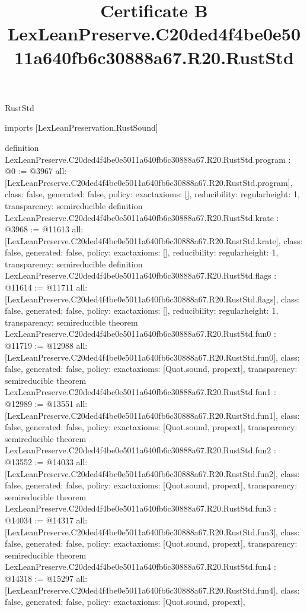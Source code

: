 \begin{lexlean}{RustStd}
\title{Certificate B LexLeanPreserve.C20ded4f4be0e5011a640fb6c30888a67.R20.RustStd}
\begin{coremodule}
imports [LexLeanPreservation.RustSound]

definition LexLeanPreserve.C20ded4f4be0e5011a640fb6c30888a67.R20.RustStd.program : @0 := @3967 {
  all: [LexLeanPreserve.C20ded4f4be0e5011a640fb6c30888a67.R20.RustStd.program],
  class: false,
  generated: false,
  policy: exact{axioms: []},
  reducibility: regular{height: 1},
  transparency: semireducible
}
definition LexLeanPreserve.C20ded4f4be0e5011a640fb6c30888a67.R20.RustStd.krate : @3968 := @11613 {
  all: [LexLeanPreserve.C20ded4f4be0e5011a640fb6c30888a67.R20.RustStd.krate],
  class: false,
  generated: false,
  policy: exact{axioms: []},
  reducibility: regular{height: 1},
  transparency: semireducible
}
definition LexLeanPreserve.C20ded4f4be0e5011a640fb6c30888a67.R20.RustStd.flags : @11614 := @11711 {
  all: [LexLeanPreserve.C20ded4f4be0e5011a640fb6c30888a67.R20.RustStd.flags],
  class: false,
  generated: false,
  policy: exact{axioms: []},
  reducibility: regular{height: 1},
  transparency: semireducible
}
theorem LexLeanPreserve.C20ded4f4be0e5011a640fb6c30888a67.R20.RustStd.fun0 : @11719 := @12988 {
  all: [LexLeanPreserve.C20ded4f4be0e5011a640fb6c30888a67.R20.RustStd.fun0],
  class: false,
  generated: false,
  policy: exact{axioms: [Quot.sound, propext]},
  transparency: semireducible
}
theorem LexLeanPreserve.C20ded4f4be0e5011a640fb6c30888a67.R20.RustStd.fun1 : @12989 := @13551 {
  all: [LexLeanPreserve.C20ded4f4be0e5011a640fb6c30888a67.R20.RustStd.fun1],
  class: false,
  generated: false,
  policy: exact{axioms: [Quot.sound, propext]},
  transparency: semireducible
}
theorem LexLeanPreserve.C20ded4f4be0e5011a640fb6c30888a67.R20.RustStd.fun2 : @13552 := @14033 {
  all: [LexLeanPreserve.C20ded4f4be0e5011a640fb6c30888a67.R20.RustStd.fun2],
  class: false,
  generated: false,
  policy: exact{axioms: [Quot.sound, propext]},
  transparency: semireducible
}
theorem LexLeanPreserve.C20ded4f4be0e5011a640fb6c30888a67.R20.RustStd.fun3 : @14034 := @14317 {
  all: [LexLeanPreserve.C20ded4f4be0e5011a640fb6c30888a67.R20.RustStd.fun3],
  class: false,
  generated: false,
  policy: exact{axioms: [Quot.sound, propext]},
  transparency: semireducible
}
theorem LexLeanPreserve.C20ded4f4be0e5011a640fb6c30888a67.R20.RustStd.fun4 : @14318 := @15297 {
  all: [LexLeanPreserve.C20ded4f4be0e5011a640fb6c30888a67.R20.RustStd.fun4],
  class: false,
  generated: false,
  policy: exact{axioms: [Quot.sound, propext]},
}
\end{coremodule}
\end{lexlean}
